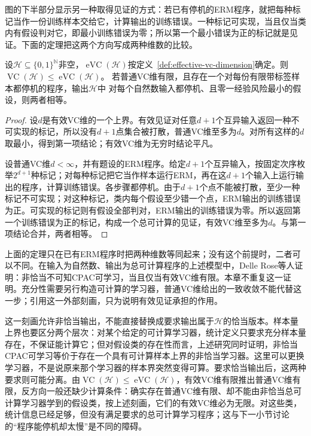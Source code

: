 图的下半部分显示另一种取得见证的方式：若已有停机的ERM程序，就把每种标记当作一份训练样本交给它，计算输出的训练错误。一种标记可实现，当且仅当类内有假设判对它，即最小训练错误为零；所以第一个最小错误为正的标记就是见证。下面的定理把这两个方向写成两种维数的比较。

\begin{theorem}[普通VC维与有效VC维的比较]
\label{thm:effective-vc-comparison}
设$\mathcal H\subseteq\{0,1\}^{\mathbb N}$非空，$\operatorname{eVC}(\mathcal H)$按定义~\ref{def:effective-vc-dimension}确定。则
$\operatorname{VC}(\mathcal H)\leq\operatorname{eVC}(\mathcal H)$。
若普通VC维有限，且存在一个对每份有限带标签样本都停机的程序，输出$\mathcal H$中
对每个自然数输入都停机、且零一经验风险最小的假设，则两者相等。
\end{theorem}

\begin{proof}
设$d$是有效VC维的一个上界。有效见证对任意$d+1$个互异输入返回一种不可实现的标记，所以没有$d+1$点集合被打散，普通VC维至多为$d$。对所有这样的$d$取最小，得到第一项结论；有效VC维为无穷时结论平凡。

设普通VC维$d<\infty$，并有题设的ERM程序。给定$d+1$个互异输入，按固定次序枚举$2^{d+1}$种标记；对每种标记把它当作样本运行ERM，再在这$d+1$个输入上运行输出的程序，计算训练错误。各步骤都停机。由于$d+1$个点不能被打散，至少一种标记不可实现；对这种标记，类内每个假设至少错一个点，ERM输出的训练错误为正。可实现的标记则有假设全部判对，ERM输出的训练错误为零。所以返回第一个训练错误为正的标记，构成一个总可计算的见证，有效VC维至多为$d$。与第一项结论合并，两者相等。
\end{proof}

上面的定理只在已有ERM程序时把两种维数等同起来；没有这个前提时，二者可以不同。在输入为自然数、输出为总可计算程序的上述模型中，Delle Rose等人证明：非恰当不可知CPAC可学习，当且仅当有效VC维有限。本章不重复这一证明。充分性需要另行构造可计算的学习器，普通VC维给出的一致收敛不能代替这一步；引用这一外部刻画，只为说明有效见证承担的作用。

这一刻画允许非恰当输出，不能直接替换成要求输出属于$\mathcal H$的恰当版本。样本量上界也要区分两个层次：对某个给定的可计算学习器，统计定义只要求充分样本量存在，不保证能计算它；但对假设类的存在性而言，上述研究同时证明，非恰当CPAC可学习等价于存在一个具有可计算样本上界的非恰当学习器。这里可以更换学习器，不是说原来那个学习器的样本界突然变得可算。要求恰当输出后，这两种要求则可能分离。由$\operatorname{VC}(\mathcal H)\leq\operatorname{eVC}(\mathcal H)$，有效VC维有限推出普通VC维有限，反方向一般还缺少计算条件：确实存在普通VC维有限、却不能由非恰当总可计算学习器学到的假设类，按上述刻画，它们的有效VC维必为无限。对这些类，统计信息已经足够，但没有满足要求的总可计算学习程序；这与下一小节讨论的“程序能停机却太慢”是不同的障碍。

